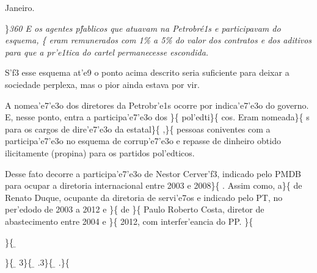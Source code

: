 Janeiro.\\
\par \}\pard \ltrpar\qj {}\sl360\widctlpar\wrapdefault\faauto{} {\rtlch{}  \ltrch{}  \tab E os agentes p\'fablicos que atuavam na Petrobr\'e1s }{\rtlch{}  \ltrch{} 
 e participavam do esquema, }\{\rtlch{} 
\ltrch{}  eram remunerados com 1\% a
5\% do valor dos contratos e dos aditivos para que a pr'e1tica do cartel
permanecesse escondida. \par \tab S'f3 esse esquema at'e9 o ponto acima
descrito seria suficiente para deixar a sociedade perplexa, mas o pior
ainda estava por vir. \par \tab A nomea'e7'e3o dos diretores da
Petrobr'e1s ocorre por indica'e7'e3o do governo. E, nesse ponto, entra a
participa'e7'e3o dos \}\{\rtlch{}  \ltrch{} 
pol'edti\}\{\rtlch{}  \ltrch{}  cos. Eram
nomeada\}\{\rtlch{}  \ltrch{} 
s para os cargos de dire'e7'e3o da estatal\}\{\rtlch{} 
\ltrch{}  ,\}\{\rtlch{}  \ltrch{}
 pessoas coniventes com a
participa'e7'e3o no esquema de corrup'e7'e3o e repasse de dinheiro
obtido ilicitamente (propina) para os partidos pol'edticos.
\par \tab Desse fato decorre a participa'e7'e3o de Nestor Cerver'f3,
indicado pelo PMDB para ocupar a diretoria internacional entre 2003 e
2008\}\{\rtlch{}  \ltrch{}  . Assim como,
a\}\{\rtlch{}  \ltrch{}  de
Renato Duque, ocupante da diretoria de servi'e7os e indicado pelo PT, no
per'edodo de 2003 a 2012 e \}\{\rtlch{}  \ltrch{}
 de \}\{\rtlch{}  \ltrch{}
 Paulo Roberto Costa, diretor de
abastecimento entre 2004 e \}\{\rtlch{}  \ltrch{}
 2012, com interfer'eancia do PP. \}\{\rtlch{} 
\ltrch{}  \par \}\{\rtlch{}
\ab{} \ltrch{} \b{} \par \}\{\rtlch{}
\ab{} \ltrch{} \b{}
3\}\{\rtlch{} \ab{} \ltrch{}
\b{} .3\}\{\rtlch{} \ab{}
\ltrch{} \b{} .\}\{\rtlch{} \ab{}
